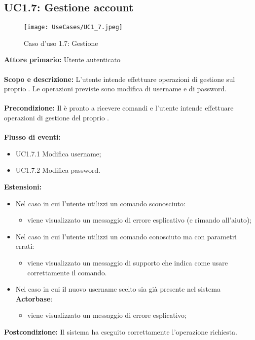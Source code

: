 \documentclass{scalatekids-article}
\begin{document}
\subsection{UC1.7: Gestione account}
\begin{figure}[H]
  \begin{center}
    \texttt{[image: UseCases/UC1\_7.jpeg]}
    \caption{Caso d'uso 1.7: Gestione }
  \end{center}
\end{figure}
\textbf{Attore primario:} Utente autenticato\\ \\
\textbf{Scopo e descrizione:} L'utente intende effettuare operazioni di gestione sul proprio . Le operazioni previste sono
modifica di username e di password.\\ \\
\textbf{Precondizione:} Il  è pronto a ricevere comandi e l'utente intende effettuare operazioni di gestione del proprio .\\ \\
\textbf{Flusso di eventi:}
\begin{itemize}
\item UC1.7.1 Modifica username;
\item UC1.7.2 Modifica password.
\end{itemize}
\textbf{Estensioni:}
\begin{itemize}
\item Nel caso in cui l'utente utilizzi un comando sconosciuto:
  \begin{itemize}
  \item viene visualizzato un messaggio di errore esplicativo (e rimando all'aiuto);
  \end{itemize}
\item Nel caso in cui l'utente utilizzi un comando conosciuto ma con parametri errati:
  \begin{itemize}
  \item viene visualizzato un messaggio di supporto che indica come usare correttamente il comando.
  \end{itemize}
\item Nel caso in cui il nuovo username scelto sia già presente nel sistema \textbf{Actorbase}:
  \begin{itemize}
  \item viene visualizzato un messaggio di errore esplicativo;
  \end{itemize}
\end{itemize}
\textbf{Postcondizione:} Il sistema ha eseguito correttamente l'operazione richiesta.
\end{document}
